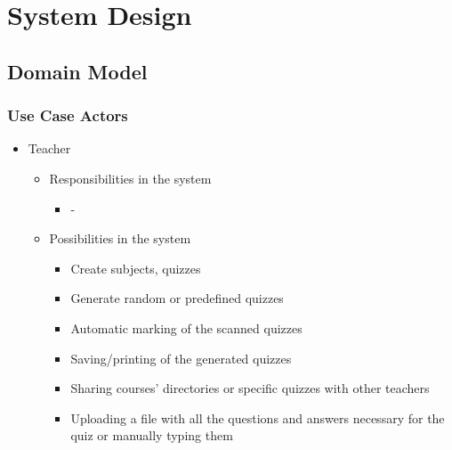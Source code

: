 \section{System Design}


\subsection{Domain Model}

\subsubsection{Use Case Actors}
\begin{itemize}
  \item Teacher
  \begin{itemize}
    \item Responsibilities in the system
    \begin{itemize}
      \item -
    \end{itemize}
    \item Possibilities in the system
    \begin{itemize}
      \item Create subjects, quizzes
      \item Generate random or predefined quizzes
      \item Automatic marking of the scanned quizzes
      \item Saving/printing of the generated quizzes
      \item Sharing courses’ directories or specific quizzes with other teachers
      \item Uploading a file with all the questions and answers necessary for the quiz or manually typing them
    \end{itemize}
  \end{itemize}
\end{itemize}


